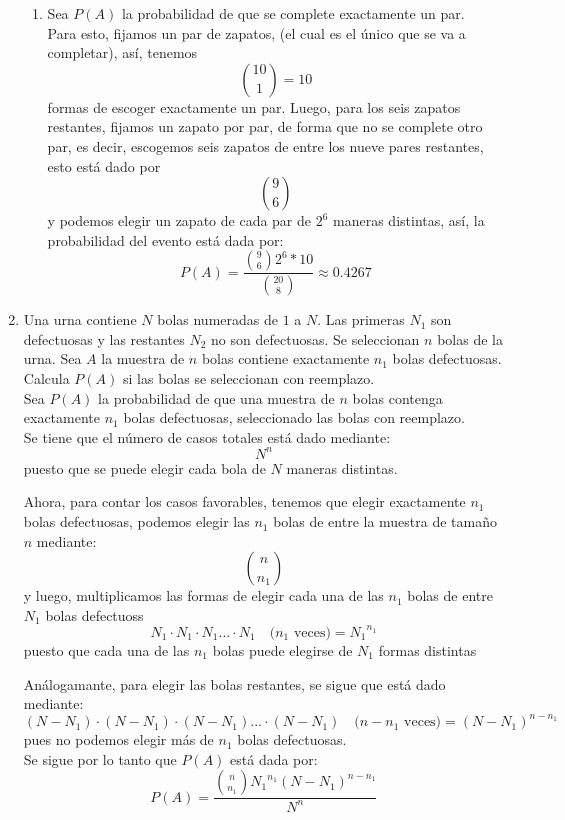 \documentclass[12pt,a4paper]{report}
\begin{document}
\begin{enumerate}
{\begin{enumerate}
	\item{
	Sea $P(A)$ la probabilidad de que se complete exactamente un par.\\
	Para esto, fijamos un par de zapatos, (el cual es el único que se va a
	completar), así, tenemos
		$${10 \choose 1} = 10$$
	formas de escoger exactamente un par.
	Luego, para los seis zapatos restantes, fijamos un zapato por par, de forma
	que no se complete otro par, es decir, escogemos seis zapatos de entre los
	nueve pares restantes, esto está dado por
		$${9}\choose{6}$$
	y podemos elegir un zapato de cada par de $2^6$ maneras distintas, así, la
	probabilidad del evento está dada por:
		$$P(A) = \frac{ {9 \choose 6} 2^6 * 10}{ {20 \choose 8} } \approx 0.4267 $$
	}
	\end{enumerate}
  }

  \item{
	Una urna contiene $N$ bolas numeradas de $1$ a $N$. Las primeras $N_{1}$ son
	defectuosas y las restantes $N_{2}$ no son defectuosas. Se seleccionan $n$
	bolas de la urna. Sea $A$ la muestra de $n$ bolas contiene exactamente
	$n_{1}$ bolas defectuosas.
	Calcula $P(A)$ si las bolas se seleccionan con reemplazo.\\

	Sea $P(A)$ la probabilidad de que una muestra de $n$ bolas contenga exactamente
	$n_1$ bolas defectuosas, seleccionado las bolas con reemplazo.\\

	Se tiene que el número de casos totales está dado mediante:
	 	$$N^n$$
	puesto que se puede elegir cada bola de $N$ maneras distintas.

	Ahora, para contar los casos favorables, tenemos que elegir exactamente $n_1$
	bolas defectuosas, podemos elegir las $n_1$ bolas de entre la muestra de tamaño
	$n$ mediante:
		$${n}\choose{n_1}$$
	y luego, multiplicamos las formas de elegir cada una de las $n_1$ bolas de entre
	$N_1$ bolas defectuoss
		$$N_1 \cdot N_1 \cdot N_1 ... \cdot N_1 \quad \text{($n_1$ veces)}  = {N_{1}}^{n_1}$$
	puesto que cada una de las $n_1$ bolas puede elegirse de $N_1$ formas distintas

	Análogamante, para elegir las bolas restantes, se sigue que está dado mediante:
		$$(N - N_1) \cdot (N - N_1) \cdot (N - N_1) ... \cdot (N - N_1)
		  \quad \text{($n - n_1$ veces)}  =(N - N_{1})^{n - n_1}$$
	pues no podemos elegir más de $n_1$ bolas defectuosas.\\

	Se sigue por lo tanto que $P(A)$ está dada por:
		$$P(A) = \frac{{n \choose n_1} {N_{1}}^{n_1} (N - N_{1})^{n - n_1} }
				{N^n}$$
  }


\end{enumerate}
\end{document}
